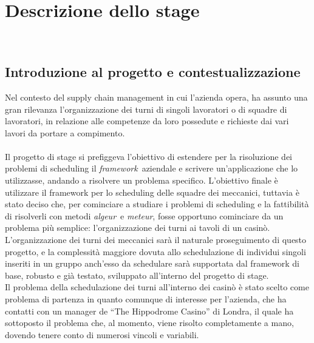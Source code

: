 
\renewcommand\theadalign{cb}
\renewcommand\theadfont{\bfseries}
\renewcommand\theadgape{\Gape[4pt]}
\renewcommand{\arraystretch}{2}

\chapter{Descrizione dello stage}
\label{cap:descrizione-stage}

\\

\section{Introduzione al progetto e contestualizzazione}
Nel contesto del supply chain management in cui l’azienda opera, ha assunto una gran rilevanza l’organizzazione dei turni di singoli lavoratori o di squadre di lavoratori, in relazione alle competenze da loro possedute e richieste dai vari lavori da portare a compimento. \\ \\
Il progetto di stage si prefiggeva l'obiettivo di estendere per la risoluzione dei problemi di scheduling il \emph{\gls{framework}}\glsfirstoccur\ aziendale e scrivere un'applicazione che lo utilizzasse, andando a risolvere un problema specifico. L'obiettivo finale è utilizzare il framework per lo scheduling delle squadre dei meccanici, tuttavia è stato deciso che, per cominciare a studiare i problemi di scheduling e la fattibilità di risolverli con metodi \emph{\gls{algeur}}\glsfirstoccur\ e \emph{\gls{meteur}}\glsfirstoccur, fosse opportuno cominciare da un problema più semplice: l'organizzazione dei turni ai tavoli di un casinò. L'organizzazione dei turni dei meccanici sarà il naturale proseguimento di questo progetto, e la complessità maggiore dovuta allo schedulazione di individui singoli inseriti in un gruppo anch'esso da schedulare sarà supportata dal framework di base, robusto e già testato, sviluppato all'interno del progetto di stage. \\ 
Il problema della schedulazione dei turni all'interno dei casinò è stato scelto come problema di partenza in quanto comunque di interesse per l'azienda, che ha contatti con un manager de ``The Hippodrome Casino'' di Londra, il quale ha sottoposto il problema che, al momento, viene risolto completamente a mano, dovendo tenere conto di numerosi vincoli e variabili. \\

